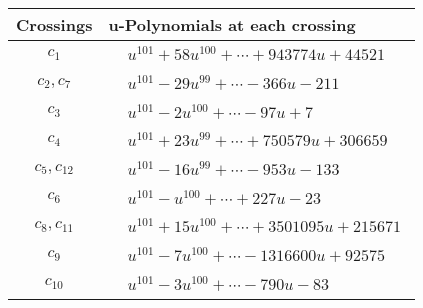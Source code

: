 \documentclass[1p]{elsarticle_modified}
\theoremstyle{definition}
\begin{document}
\begin{tabular}{m{50pt}|m{274pt}}
Crossings & \hspace{64pt}u-Polynomials at each crossing \\
\hline $$\begin{aligned}c_{1}\end{aligned}$$&$\begin{aligned}
&u^{101}+58 u^{100}+\cdots+943774 u+44521
\end{aligned}$\\
\hline $$\begin{aligned}c_{2},c_{7}\end{aligned}$$&$\begin{aligned}
&u^{101}-29 u^{99}+\cdots-366 u-211
\end{aligned}$\\
\hline $$\begin{aligned}c_{3}\end{aligned}$$&$\begin{aligned}
&u^{101}-2 u^{100}+\cdots-97 u+7
\end{aligned}$\\
\hline $$\begin{aligned}c_{4}\end{aligned}$$&$\begin{aligned}
&u^{101}+23 u^{99}+\cdots+750579 u+306659
\end{aligned}$\\
\hline $$\begin{aligned}c_{5},c_{12}\end{aligned}$$&$\begin{aligned}
&u^{101}-16 u^{99}+\cdots-953 u-133
\end{aligned}$\\
\hline $$\begin{aligned}c_{6}\end{aligned}$$&$\begin{aligned}
&u^{101}- u^{100}+\cdots+227 u-23
\end{aligned}$\\
\hline $$\begin{aligned}c_{8},c_{11}\end{aligned}$$&$\begin{aligned}
&u^{101}+15 u^{100}+\cdots+3501095 u+215671
\end{aligned}$\\
\hline $$\begin{aligned}c_{9}\end{aligned}$$&$\begin{aligned}
&u^{101}-7 u^{100}+\cdots-1316600 u+92575
\end{aligned}$\\
\hline $$\begin{aligned}c_{10}\end{aligned}$$&$\begin{aligned}
&u^{101}-3 u^{100}+\cdots-790 u-83
\end{aligned}$\\
\hline
\end{tabular}\\~\\
\end{document}
